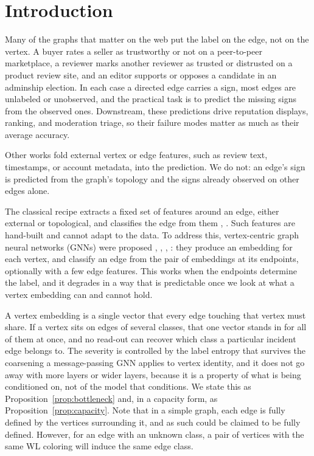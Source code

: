 \documentclass[sigconf, review, anonymous]{acmart}
\begin{document}
\section{Introduction}

Many of the graphs that matter on the web put the label on the edge, not on the vertex. A buyer rates a seller as trustworthy or not on a peer-to-peer marketplace, a reviewer marks another reviewer as trusted or distrusted on a product review site, and an editor supports or opposes a candidate in an adminship election. In each case a directed edge carries a sign, most edges are unlabeled or unobserved, and the practical task is to predict the missing signs from the observed ones. Downstream, these predictions drive reputation displays, ranking, and moderation triage, so their failure modes matter as much as their average accuracy.

Other works fold external vertex or edge features, such as review text, timestamps, or account metadata, into the prediction. We do not: an edge's sign is predicted from the graph's topology and the signs already observed on other edges alone.

The classical recipe extracts a fixed set of features around an edge, either external or topological, and classifies the edge from them \citep{PLACEHOLDER: Heider balance theory / Cartwright-Harary structural balance}, \citep{PLACEHOLDER: Leskovec, Huttenlocher, Kleinberg -- signed network sign prediction / status theory}. Such features are hand-built and cannot adapt to the data. To address this, vertex-centric graph neural networks (GNNs) were proposed \citep{PLACEHOLDER: SGCN}, \citep{PLACEHOLDER: SiGAT}, \citep{PLACEHOLDER: SNEA}, \citep{PLACEHOLDER: SDGNN / SGA-GSGNN or other directed signed GNN}: they produce an embedding for each vertex, and classify an edge from the pair of embeddings at its endpoints, optionally with a few edge features. This works when the endpoints determine the label, and it degrades in a way that is predictable once we look at what a vertex embedding can and cannot hold.

A vertex embedding is a single vector that every edge touching that vertex must share. If a vertex sits on edges of several classes, that one vector stands in for all of them at once, and no read-out can recover which class a particular incident edge belongs to. The severity is controlled by the label entropy that survives the coarsening a message-passing GNN applies to vertex identity, and it does not go away with more layers or wider layers, because it is a property of what is being conditioned on, not of the model that conditions. We state this as Proposition~\ref{prop:bottleneck} and, in a capacity form, as Proposition~\ref{prop:capacity}. Note that in a simple graph, each edge is fully defined by the vertices surrounding it, and as such could be claimed to be fully defined. However, for an edge with an unknown class, a pair of vertices with the same WL coloring will induce the same edge class.
\end{document}
